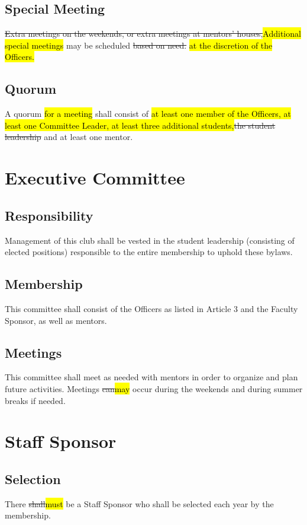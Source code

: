 \documentclass[12pt, a4paper]{article}
\begin{document}
\subsection{Special Meeting}
\st{Extra meetings on the weekends, or extra meetings at mentors’ houses,}\hl{Additional special meetings} may be scheduled \st{based on need.} \hl{at the discretion of the Officers.}
\subsection{Quorum}
A quorum \hl{for a meeting} shall consist of \hl{at least one member of the Officers, at least one Committee Leader, at least three additional students,}\st{the student leadership} and at least one mentor.
\section{Executive Committee}
\subsection{Responsibility}
Management of this club shall be vested in the student leadership (consisting of elected positions) responsible to the entire membership to uphold these bylaws.
\subsection{Membership}
This committee shall consist of the Officers as listed in Article 3 and the Faculty Sponsor, as well as mentors.
\subsection{Meetings}
This committee shall meet as needed with mentors in order to organize and plan future activities. Meetings \st{can}\hl{may} occur during the weekends and during summer breaks if needed.
\section{Staff Sponsor}
\subsection{Selection}
There \st{shall}\hl{must} be a Staff Sponsor who shall be selected each year by the membership.
\end{document}
